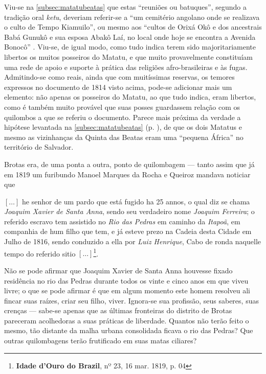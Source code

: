 Viu-se na \autoref{subsec:matatubeatas} que estas ``reuniões ou batuques'', segundo a tradição oral \textit{ketu}, deveriam referir-se a ``um cemitério angolano onde se realizava o culto de Tempo Kiamuilo'', ou mesmo aos ``cultos de Orixá Okô e dos ancestrais Babá Gunukô e sua esposa Abakô Laí, no local onde hoje se encontra a Avenida Bonocô'' \cite[pp.~373-374]{silveira_alaketo_2003}. Viu-se, de igual modo, como tudo indica terem sido majoritariamente libertos os muitos posseiros do Matatu, e que muito provavelmente constituíam uma rede de apoio e suporte à prática das religiões afro-brasileiras e às fugas. Admitindo-se como reais, ainda que com muitíssimas reservas, os temores expressos no documento de 1814 visto acima, pode-se adicionar mais um elemento: não apenas os posseiros do Matatu, ao que tudo indica, eram libertos, como é também muito provável que suas posses guardassem relação com os quilombos a que se referiu o documento. Parece mais próxima da verdade a hipótese levantada na \autoref{subsec:matatubeatas} (p. \pageref{subsec:matatubeatas}), de que os dois Matatus e mesmo as vizinhanças da Quinta das Beatas eram uma ``pequena África'' no território de Salvador.

Brotas era, de uma ponta a outra, ponto de quilombagem --- tanto assim que já em 1819 um furibundo Manoel Marques da Rocha e Queiroz mandava noticiar que

\begin{citacao}
\([\dots]\) he senhor de um pardo que está fugido ha 25 annos, o qual diz se chama \textit{Joaquim Xavier de Santa Anna}, sendo seu verdadeiro nome \textit{Joaquim Ferreira}; o referido escravo tem assistido no \textit{Rio das Pedras} em caminho da \textit{Itapoã}, em companhia de hum filho que tem, e já esteve prezo na Cadeia desta Cidade em Julho de 1816, sendo conduzido a ella por \textit{Luiz Henrique}, Cabo de ronda naquelle tempo do referido sitio \([\dots]\)\footnote{\textbf{Idade d'Ouro do Brazil}, nº 23, 16 mar. 1819, p. 04}.
\end{citacao}

Não se pode afirmar que Joaquim Xavier de Santa Anna houvesse fixado residência no rio das Pedras durante todos os vinte e cinco anos em que viveu livre; o que se pode afirmar é que em algum momento este homem resolveu ali fincar suas raízes, criar seu filho, viver. Ignora-se sua profissão, seus saberes, suas crenças --- sabe-se apenas que as últimas fronteiras do distrito de Brotas pareceram acolhedoras a suas práticas de liberdade. Quantos não terão feito o mesmo, tão distante da malha urbana consolidada ficava o rio das Pedras? Que outras quilombagens terão frutificado em suas matas ciliares?

